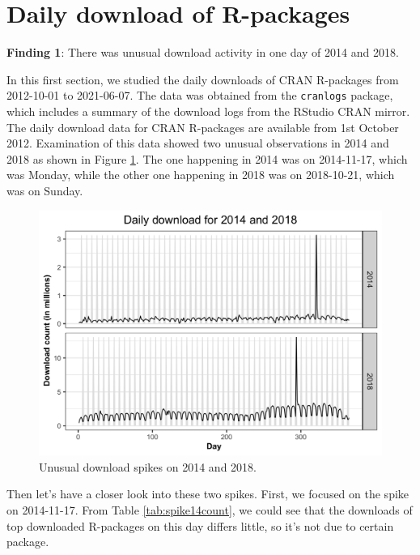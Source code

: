 \documentclass[
]{book}
\newenvironment{discovery}[1]{%
  \begin{tcolorbox}[colback=blue!30,colframe=blue!80!black]#1}{\end{tcolorbox}}
\begin{document}
\hypertarget{daily-download-of-r-packages}{%
\section{Daily download of R-packages}\label{daily-download-of-r-packages}}

\begin{discovery}
\textbf{Finding 1}: There was unusual download activity in one day of
2014 and 2018.
\end{discovery}

In this first section, we studied the daily downloads of CRAN R-packages from 2012-10-01 to 2021-06-07. The data was obtained from the \texttt{cranlogs} package\autocite{cranlogs}, which includes a summary of the download logs from the RStudio CRAN mirror. The daily download data for CRAN R-packages are available from 1st October 2012. Examination of this data showed two unusual observations in 2014 and 2018 as shown in Figure \ref{fig:unusual-spikes}. The one happening in 2014 was on 2014-11-17, which was Monday, while the other one happening in 2018 was on 2018-10-21, which was on Sunday.



\begin{figure}

{\centering \includegraphics{figures/unusual-spikes-1} 

}

\caption{Unusual download spikes on 2014 and 2018.}\label{fig:unusual-spikes}
\end{figure}

Then let's have a closer look into these two spikes. First, we focused on the spike on 2014-11-17. From Table \ref{tab:spike14count}, we could see that the downloads of top downloaded R-packages on this day differs little, so it's not due to certain package.
\end{document}
